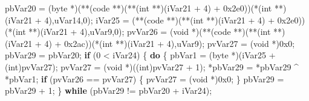 \documentclass[
]{article}
\newenvironment{Shaded}{}{}
\newcommand{\BaseNTok}[1]{\textcolor[rgb]{0.25,0.63,0.44}{#1}}
\newcommand{\ControlFlowTok}[1]{\textcolor[rgb]{0.00,0.44,0.13}{\textbf{#1}}}
\newcommand{\DataTypeTok}[1]{\textcolor[rgb]{0.56,0.13,0.00}{#1}}
\newcommand{\DecValTok}[1]{\textcolor[rgb]{0.25,0.63,0.44}{#1}}
\newcommand{\NormalTok}[1]{#1}
\newcommand{\OperatorTok}[1]{\textcolor[rgb]{0.40,0.40,0.40}{#1}}
\begin{document}
\begin{Shaded}
\begin{Highlighting}[]
\NormalTok{  pbVar20 }\OperatorTok{=} \OperatorTok{(}\NormalTok{byte }\OperatorTok{*)(**(}\NormalTok{code }\OperatorTok{**)(**(}\DataTypeTok{int} \OperatorTok{**)(}\NormalTok{iVar21 }\OperatorTok{+} \DecValTok{4}\OperatorTok{)} \OperatorTok{+} \BaseNTok{0x2e0}\OperatorTok{))(*(}\DataTypeTok{int} \OperatorTok{**)(}\NormalTok{iVar21 }\OperatorTok{+} \DecValTok{4}\OperatorTok{),}\NormalTok{uVar14}\OperatorTok{,}\DecValTok{0}\OperatorTok{);}
\NormalTok{  iVar25 }\OperatorTok{=} \OperatorTok{(**(}\NormalTok{code }\OperatorTok{**)(**(}\DataTypeTok{int} \OperatorTok{**)(}\NormalTok{iVar21 }\OperatorTok{+} \DecValTok{4}\OperatorTok{)} \OperatorTok{+} \BaseNTok{0x2e0}\OperatorTok{))(*(}\DataTypeTok{int} \OperatorTok{**)(}\NormalTok{iVar21 }\OperatorTok{+} \DecValTok{4}\OperatorTok{),}\NormalTok{uVar9}\OperatorTok{,}\DecValTok{0}\OperatorTok{);}
\NormalTok{  pvVar26 }\OperatorTok{=} \OperatorTok{(}\DataTypeTok{void} \OperatorTok{*)(**(}\NormalTok{code }\OperatorTok{**)(**(}\DataTypeTok{int} \OperatorTok{**)(}\NormalTok{iVar21 }\OperatorTok{+} \DecValTok{4}\OperatorTok{)} \OperatorTok{+} \BaseNTok{0x2ac}\OperatorTok{))(*(}\DataTypeTok{int} \OperatorTok{**)(}\NormalTok{iVar21 }\OperatorTok{+} \DecValTok{4}\OperatorTok{),}\NormalTok{uVar9}\OperatorTok{);}
\NormalTok{  pvVar27 }\OperatorTok{=} \OperatorTok{(}\DataTypeTok{void} \OperatorTok{*)}\BaseNTok{0x0}\OperatorTok{;}
\NormalTok{  pbVar29 }\OperatorTok{=}\NormalTok{ pbVar20}\OperatorTok{;}
  \ControlFlowTok{if} \OperatorTok{(}\DecValTok{0} \OperatorTok{\textless{}}\NormalTok{ iVar24}\OperatorTok{)} \OperatorTok{\{}
    \ControlFlowTok{do} \OperatorTok{\{}
\NormalTok{      pbVar1 }\OperatorTok{=} \OperatorTok{(}\NormalTok{byte }\OperatorTok{*)(}\NormalTok{iVar25 }\OperatorTok{+} \OperatorTok{(}\DataTypeTok{int}\OperatorTok{)}\NormalTok{pvVar27}\OperatorTok{);}
\NormalTok{      pvVar27 }\OperatorTok{=} \OperatorTok{(}\DataTypeTok{void} \OperatorTok{*)((}\DataTypeTok{int}\OperatorTok{)}\NormalTok{pvVar27 }\OperatorTok{+} \DecValTok{1}\OperatorTok{);}
      \OperatorTok{*}\NormalTok{pbVar29 }\OperatorTok{=} \OperatorTok{*}\NormalTok{pbVar29 }\OperatorTok{\^{}} \OperatorTok{*}\NormalTok{pbVar1}\OperatorTok{;}
      \ControlFlowTok{if} \OperatorTok{(}\NormalTok{pvVar26 }\OperatorTok{==}\NormalTok{ pvVar27}\OperatorTok{)} \OperatorTok{\{}
\NormalTok{        pvVar27 }\OperatorTok{=} \OperatorTok{(}\DataTypeTok{void} \OperatorTok{*)}\BaseNTok{0x0}\OperatorTok{;}
      \OperatorTok{\}}
\NormalTok{      pbVar29 }\OperatorTok{=}\NormalTok{ pbVar29 }\OperatorTok{+} \DecValTok{1}\OperatorTok{;}
    \OperatorTok{\}} \ControlFlowTok{while} \OperatorTok{(}\NormalTok{pbVar29 }\OperatorTok{!=}\NormalTok{ pbVar20 }\OperatorTok{+}\NormalTok{ iVar24}\OperatorTok{);}

\end{Highlighting}
\end{Shaded}
\end{document}

